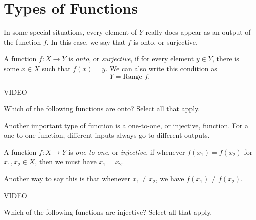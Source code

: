 \documentclass{ximera}
\begin{document}
\section*{Types of Functions}

In some special situations, every element of $Y$ really does appear as an output of the function $f$. In this case, we say that $f$ is onto, or surjective.

\begin{definition}
A function $f:X\rightarrow Y$ is \emph{onto}, or \emph{surjective}, if for every element $y\in Y$, there is some $x\in X$ such that $f(x) = y$. We can also write this condition as 
\[
Y = \textrm{Range }f.
\]
\end{definition}

VIDEO

\begin{problem}
Which of the following functions are onto? Select all that apply.
\begin{selectAll}
\end{selectAll}
\end{problem}

Another important type of function is a one-to-one, or injective, function. For a one-to-one function, different inputs always go to different outputs.

\begin{definition}
A function $f:X\rightarrow Y$ is \emph{one-to-one}, or \emph{injective}, if whenever $f(x_1) = f(x_2)$ for $x_1,x_2\in X$, then we must have $x_1 = x_2$.

Another way to say this is that whenever $x_1\neq x_2$, we have $f(x_1)\neq f(x_2)$.
\end{definition}

VIDEO

\begin{problem}
Which of the following functions are injective? Select all that apply.
\begin{selectAll}
\end{selectAll}
\end{problem}
\end{document}
